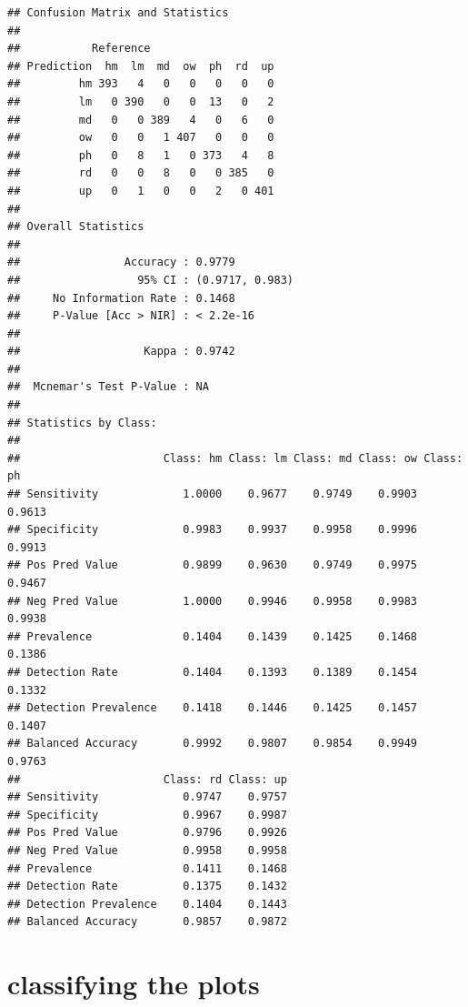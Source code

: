 \documentclass[
]{article}
\begin{document}
\begin{verbatim}
## Confusion Matrix and Statistics
## 
##           Reference
## Prediction  hm  lm  md  ow  ph  rd  up
##         hm 393   4   0   0   0   0   0
##         lm   0 390   0   0  13   0   2
##         md   0   0 389   4   0   6   0
##         ow   0   0   1 407   0   0   0
##         ph   0   8   1   0 373   4   8
##         rd   0   0   8   0   0 385   0
##         up   0   1   0   0   2   0 401
## 
## Overall Statistics
##                                          
##                Accuracy : 0.9779         
##                  95% CI : (0.9717, 0.983)
##     No Information Rate : 0.1468         
##     P-Value [Acc > NIR] : < 2.2e-16      
##                                          
##                   Kappa : 0.9742         
##                                          
##  Mcnemar's Test P-Value : NA             
## 
## Statistics by Class:
## 
##                      Class: hm Class: lm Class: md Class: ow Class: ph
## Sensitivity             1.0000    0.9677    0.9749    0.9903    0.9613
## Specificity             0.9983    0.9937    0.9958    0.9996    0.9913
## Pos Pred Value          0.9899    0.9630    0.9749    0.9975    0.9467
## Neg Pred Value          1.0000    0.9946    0.9958    0.9983    0.9938
## Prevalence              0.1404    0.1439    0.1425    0.1468    0.1386
## Detection Rate          0.1404    0.1393    0.1389    0.1454    0.1332
## Detection Prevalence    0.1418    0.1446    0.1425    0.1457    0.1407
## Balanced Accuracy       0.9992    0.9807    0.9854    0.9949    0.9763
##                      Class: rd Class: up
## Sensitivity             0.9747    0.9757
## Specificity             0.9967    0.9987
## Pos Pred Value          0.9796    0.9926
## Neg Pred Value          0.9958    0.9958
## Prevalence              0.1411    0.1468
## Detection Rate          0.1375    0.1432
## Detection Prevalence    0.1404    0.1443
## Balanced Accuracy       0.9857    0.9872
\end{verbatim}

\section{classifying the plots}\label{classifying-the-plots-3}
\end{document}
